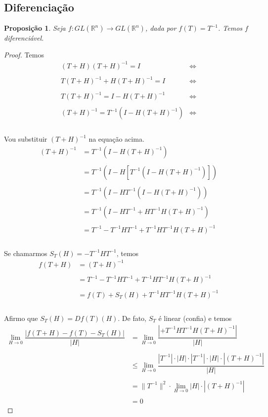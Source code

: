 \documentclass{article}
\newtheorem{prop}{Proposição}[section]
\theoremstyle{theorem}
\theoremstyle{lemma}
\theoremstyle{definition}
\theoremstyle{remark}
\begin{document}
\subsection{Diferenciação}
\begin{prop}
Seja $f: GL(\mathbb{R}^n) \to GL(\mathbb{R}^n)$, dada por $f(T) = T^{-1}$.  Temos $f$ diferenciável.
\end{prop}
	\begin{proof}
	Temos  \begin{align*}
(T+H)(T+H)^{-1} = I &\iff \\~\\
T(T+H)^{-1} +H(T+H)^{-1} = I &\iff \\~\\
T(T+H)^{-1} = I -H(T+H)^{-1} &\iff \\~\\
(T+H)^{-1} = T^{-1}  ( I -H(T+H)^{-1} )  &\iff \\~\\
\end{align*}

Vou substituir $(T+H)^{-1}$ na equação acima.\begin{align*}
(T+H)^{-1} &= T^{-1}  ( I -H(T+H)^{-1} )   \\~\\
 &= T^{-1}  ( I -H \left[T^{-1}  ( I -H(T+H)^{-1} )\right])   \\~\\
 &= T^{-1}  ( I -H T^{-1}  ( I -H(T+H)^{-1} ))   \\~\\
 &= T^{-1}  ( I -H T^{-1}   +HT^{-1}H(T+H)^{-1} )   \\~\\
 &= T^{-1}   -T^{-1}H T^{-1}   +T^{-1}HT^{-1}H(T+H)^{-1}    \\~\\
\end{align*}

Se chamarmos $S_T(H) = -T^{-1}HT^{-1}$, temos \begin{align*}
f(T+H) &= (T+H)^{-1}    \\~\\
 &= T^{-1}   -T^{-1}H T^{-1}   +T^{-1}HT^{-1}H(T+H)^{-1}    \\~\\
 &= f(T)   +S_T(H)   +T^{-1}HT^{-1}H(T+H)^{-1}    \\~\\
\end{align*}

Afirmo que $S_T(H) = Df(T)(H)$. De fato, $S_T$ é linear (confia) e temos \begin{align*}
\displaystyle\lim_{H\to 0} \dfrac{| f(T+H) - f(T) - S_T(H)|}{|H|} &= \displaystyle\lim_{H\to 0}\dfrac{| +T^{-1}HT^{-1}H(T+H)^{-1} |}{|H|} \\~\\
&\leq \displaystyle\lim_{H \to 0}\dfrac{|T^{-1}|\cdot |H|\cdot |T^{-1}| \cdot |H| \cdot |(T+H)^{-1}|}{|H|} \\~\\
&= \|T^{-1}\|^2\cdot \displaystyle\lim_{H \to 0}|H| \cdot |(T+H)^{-1}| \\~\\
&=0
\end{align*}
	\end{proof}
\end{document}
